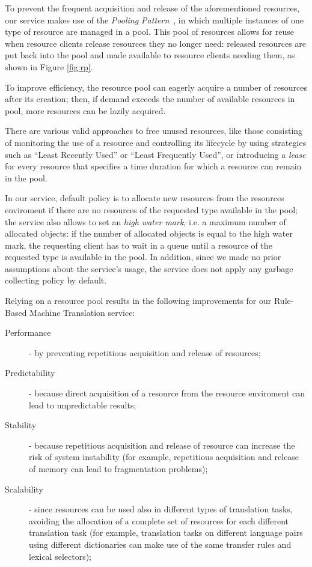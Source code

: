 \documentclass[11pt]{article}
\begin{document}
To prevent the frequent acquisition and release of the aforementioned resources, our service makes use of the \emph{Pooling Pattern}~\citep{kircher2001}, in which multiple instances of one type of resource are managed in a pool. This pool of resources allows for reuse when resource clients release resources they no longer need: released resources are put back into the pool and made available to resource clients needing them, as shown in Figure \ref{fig:rp}.

To improve efficiency, the resource pool can eagerly acquire a number of resources after its creation; then, if demand exceeds the number of available resources in pool, more resources can be lazily acquired.

There are various valid approaches to free unused resources, like those consisting of monitoring the use of a resource and controlling its lifecycle by using  strategies such as ``Least Recently Used'' or ``Least Frequently Used'', or introducing a \emph{lease} for every resource that specifies a time duration for which a resource can remain in the pool.

In our service, default policy is to allocate new resources from the resources enviroment if there are no resources of the requested type available in the pool; the service also allows to set an \emph{high water mark}, i.e. a maximum number of allocated objects: if the number of allocated objects is equal to the high water mark, the requesting client has to wait in a queue until a resource of the requested type is available in the pool. In addition, since we made no prior assumptions about the service's usage, the service does not apply any garbage collecting policy by default.

Relying on a resource pool results in the following improvements for our Rule-Based Machine Translation service:

\begin{description}
 \item[Performance] - by preventing repetitious acquisition and release of resources;
 \item[Predictability] - because direct acquisition of a resource from the resource enviroment can lead to unpredictable results;
 \item[Stability] - because repetitious acquisition and release of resource can increase the risk of system instability (for example, repetitious acquisition and release of memory can lead to fragmentation problems);
 \item[Scalability] - since resources can be used also in different types of translation tasks, avoiding the allocation of a complete set of resources for each different translation task (for example, translation tasks on different language pairs using different dictionaries can make use of the same transfer rules and lexical selectors);
\end{description}
\end{document}

